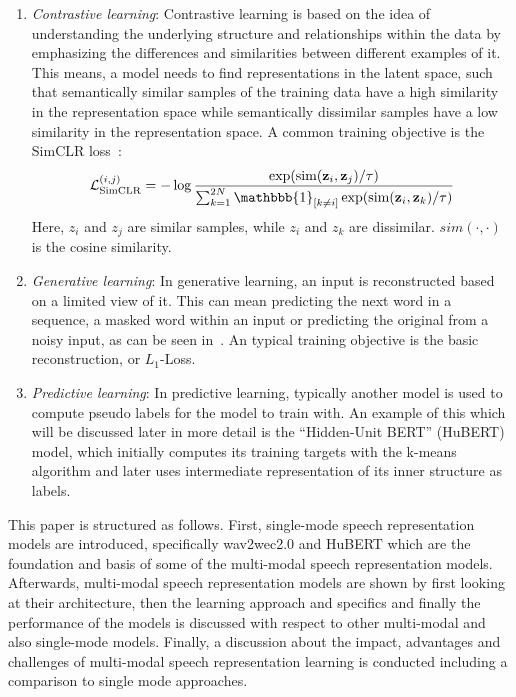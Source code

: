\begin{enumerate}
    \item \textit{Contrastive learning}: Contrastive learning is based on the idea of understanding the underlying structure and relationships within the data by emphasizing the differences and similarities between different examples of it. This means, a model needs to find representations in the latent space, such that semantically similar samples of the training data have a high similarity in the representation space while semantically dissimilar samples have a low similarity in the representation space. A common training objective is the SimCLR loss~\cite{simclr}: $$\mathcal{L}_\text{SimCLR}^{(i,j)} = - \log\frac{\exp(\text{sim}(\mathbf{z}_i, \mathbf{z}_j) / \tau)}{\sum_{k=1}^{2N} \mathbbb{1}_{[k \neq i]} \exp(\text{sim}(\mathbf{z}_i, \mathbf{z}_k) / \tau)}$$Here, $z_i$ and $z_j$ are similar samples, while $z_i$ and $z_k$ are dissimilar. $sim(\cdot,\cdot)$ is the cosine similarity.
    \item \textit{Generative learning}: In generative learning, an input is reconstructed based on a limited view of it. This can mean predicting the next word in a sequence, a masked word within an input or predicting the original from a noisy input, as can be seen in~\cite{denoising-autoencoder}. An typical training objective is the basic reconstruction, or $L_1$-Loss.
    \item \textit{Predictive learning}: In predictive learning, typically another model is used to compute pseudo labels for the model to train with. An example of this which will be discussed later in more detail is the ``Hidden-Unit BERT'' (HuBERT) model, which initially computes its training targets with the k-means algorithm and later uses intermediate representation of its inner structure as labels.
\end{enumerate}
This paper is structured as follows. First, single-mode speech representation models are introduced, specifically wav2wec2.0 and HuBERT which are the foundation and basis of some of the multi-modal speech representation models. Afterwards, multi-modal speech representation models are shown by first looking at their architecture, then the learning approach and specifics and finally the performance of the models is discussed with respect to other multi-modal and also single-mode models. Finally, a discussion about the impact, advantages and challenges of multi-modal speech representation learning is conducted including a comparison to single mode approaches.
